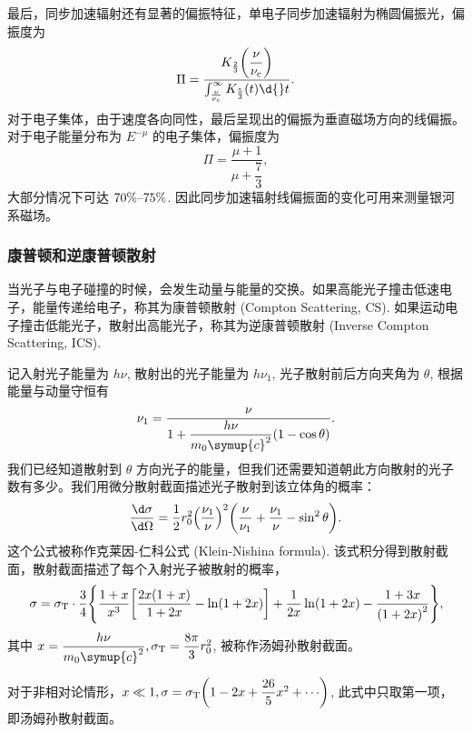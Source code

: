 \documentclass[../天体物理基础.tex]{subfiles}
\begin{document}
最后，同步加速辐射还有显著的偏振特征，单电子同步加速辐射为椭圆偏振光，偏振度为
\begin{equation}
\Pi=\frac{K_{\frac{2}{3}}\mleft(\dfrac{\nu}{\nu_{\mathrm{c}}}\mright)}{\int_{\frac{\nu}{\nu_{\mathrm{c}}}}^{\infty}K_{\frac{5}{3}}\mleft(t\mright)\d{}t}.
\end{equation}
对于电子集体，由于速度各向同性，最后呈现出的偏振为垂直磁场方向的线偏振。对于电子能量分布为 $E^{-\mu}$ 的电子集体，偏振度为
\begin{equation}
\Pi=\frac{\mu+1}{\mu+\dfrac{7}{3}},
\end{equation}
大部分情况下可达 $70\%\text{\textendash}75\%$. 因此同步加速辐射线偏振面的变化可用来测量银河系磁场。

\subsubsection{康普顿和逆康普顿散射}
当光子与电子碰撞的时候，会发生动量与能量的交换。如果高能光子撞击低速电子，能量传递给电子，称其为康普顿散射 (Compton Scattering, CS). 如果运动电子撞击低能光子，散射出高能光子，称其为逆康普顿散射 (Inverse Compton Scattering, ICS).

记入射光子能量为 $h\nu$, 散射出的光子能量为 $h\nu_{1}$, 光子散射前后方向夹角为 $\theta$, 根据能量与动量守恒有
\begin{equation}
\nu_{1}=\frac{\nu}{1+\dfrac{h\nu}{m_{0}\symup{c}^{2}}\mleft(1-\cos{\theta}\mright)}.
\end{equation}
我们已经知道散射到 $\theta$ 方向光子的能量，但我们还需要知道朝此方向散射的光子数有多少。我们用微分散射截面描述光子散射到该立体角的概率：
\begin{equation}
\frac{\d\sigma}{\d\Omega}=\frac{1}{2}r_{0}^{2}\mleft(\frac{\nu_{1}}{\nu}\mright)^{2}\mleft(\frac{\nu}{\nu_{1}}+\frac{\nu_{1}}{\nu}-\sin^{2}{\theta}\mright).
\end{equation}
这个公式被称作克莱因{}-{}仁科公式 (Klein-Nishina formula). 该式积分得到散射截面，散射截面描述了每个入射光子被散射的概率，
\begin{equation}
\sigma=\sigma_{\mathrm{T}}\cdot\frac{3}{4}\mleft\{\frac{1+x}{x^{3}}\mleft[\frac{2x\mleft(1+x\mright)}{1+2x}-\ln\mleft(1+2x\mright)\mright]+\frac{1}{2x}\ln\mleft(1+2x\mright)-\frac{1+3x}{\mleft(1+2x\mright)^{2}}\mright\},
\end{equation}
其中 $x=\dfrac{h\nu}{m_{0}\symup{c}^{2}},\sigma_{\mathrm{T}}=\dfrac{8\pi}{3}r_{0}^{2}$, 被称作汤姆孙散射截面。

对于非相对论情形，$x\ll1,\sigma=\sigma_{\mathrm{T}}\mleft(1-2x+\dfrac{26}{5}x^{2}+\cdots\mright)$, 此式中只取第一项，即汤姆孙散射截面。
\end{document}

